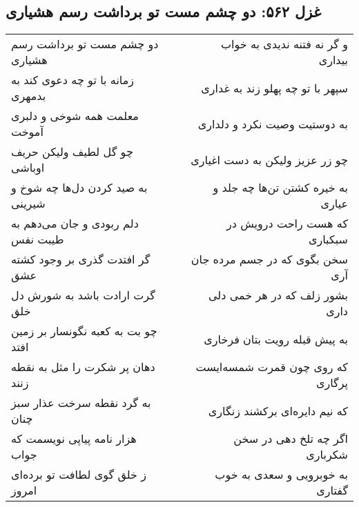 \begin{center}
\section*{غزل ۵۶۲: دو چشم مست تو برداشت رسم هشیاری}
\label{sec:562}
\begin{longtable}{l p{0.5cm} r}
دو چشم مست تو برداشت رسم هشیاری
&&
و گر نه فتنه ندیدی به خواب بیداری
\\
زمانه با تو چه دعوی کند به بدمهری
&&
سپهر با تو چه پهلو زند به غداری
\\
معلمت همه شوخی و دلبری آموخت
&&
به دوستیت وصیت نکرد و دلداری
\\
چو گل لطیف ولیکن حریف اوباشی
&&
چو زر عزیز ولیکن به دست اغیاری
\\
به صید کردن دل‌ها چه شوخ و شیرینی
&&
به خیره کشتن تن‌ها چه جلد و عیاری
\\
دلم ربودی و جان می‌دهم به طیبت نفس
&&
که هست راحت درویش در سبکباری
\\
گر افتدت گذری بر وجود کشته عشق
&&
سخن بگوی که در جسم مرده جان آری
\\
گرت ارادت باشد به شورش دل خلق
&&
بشور زلف که در هر خمی دلی داری
\\
چو بت به کعبه نگونسار بر زمین افتد
&&
به پیش قبله رویت بتان فرخاری
\\
دهان پر شکرت را مثل به نقطه زنند
&&
که روی چون قمرت شمسه‌ایست پرگاری
\\
به گرد نقطه سرخت عذار سبز چنان
&&
که نیم دایره‌ای برکشند زنگاری
\\
هزار نامه پیاپی نویسمت که جواب
&&
اگر چه تلخ دهی در سخن شکرباری
\\
ز خلق گوی لطافت تو برده‌ای امروز
&&
به خوبرویی و سعدی به خوب گفتاری
\\
\end{longtable}
\end{center}
